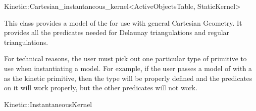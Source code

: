 

\begin{ccRefClass}{Kinetic::Cartesian_instantaneous_kernel<ActiveObjectsTable, StaticKernel>}  %


\ccDefinition
  
This class provides a model of the  for
use with general Cartesian Geometry. It provides all the predicates
needed for Delaunay triangulations and regular triangulations.

For technical reasons, the user must pick out one particular type of
primitive to use when instantiating a model. For example, if the user
passes a model of  with a
 as the kinetic primitive, then the type
 will be properly defined and the predicates on it will
work properly, but the other predicates will not work.


\ccIsModel

Kinetic::InstantaneousKernel

\end{ccRefClass}


